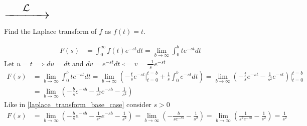 \documentclass[notes]{subfiles}
\begin{document}
\hspace{0.05\textwidth}
$\scalebox{2}{\ensuremath{\xrightarrow{\hspace{0.03\textwidth} \mathcal{L} \hspace{0.03\textwidth}}}}$
\hspace{0.05\textwidth}

\begin{exercise}
    Find the Laplace transform of $f$ as $f(t) = t$.
\end{exercise}
\begin{solution}
    \begin{align*}
        F(s)
        &= \int_0^\infty f(t)e^{-st}dt
        = \lim_{b\to\infty} \int_0^b te^{-st}dt
    \end{align*}
    Let $u = t \implies du = dt$ and $dv = e^{-st}dt \impliedby v = \frac{-1}{s}e^{-st}$
    \begin{align*}
        F(s)
        &= \lim_{b\to\infty} \int_0^b te^{-st}dt
        = \lim_{b\to\infty} \left( -\frac{t}{s}e^{-st}\Big|_{t = 0}^{t = b} + \frac{1}{s} \int_0^b e^{-st}dt \right)
        = \lim_{b\to\infty} \left( -\frac{t}{s}e^{-st} - \frac{1}{s^2} e^{-st} \right)\Bigg|_{t = 0}^{t = b} \\
        &= \lim_{b\to\infty} \left( -\frac{b}{s}e^{-sb} - \frac{1}{s^2}e^{-sb} - \frac{1}{s^2} \right)
    \end{align*}
    Like in \cref{laplace_transform_base_case} consider $s > 0$
    \begin{align*}
        F(s)
        &= \lim_{b\to\infty} \left( -\frac{b}{s}e^{-sb} - \frac{1}{s^2}e^{-sb} - \frac{1}{s^2} \right)
        = \lim_{b\to\infty} \left( -\frac{b}{se^{-sb}} - \frac{1}{s^2} \right)
        = \lim_{b\to\infty} \left( \frac{1}{s^2e^{-sb}} - \frac{1}{s^2} \right)
        = \frac{1}{s^2}
    \end{align*}
\end{solution}
\end{document}
